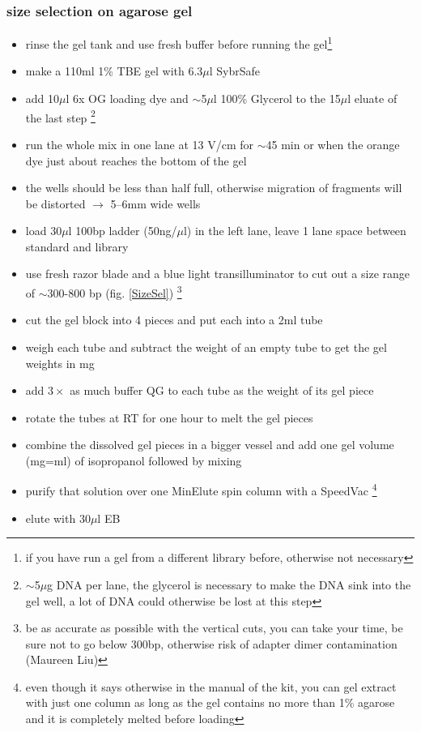 \subsubsection
{size selection on agarose gel}\label{sizeSelection}
\begin{itemize}
\item rinse the gel tank and use fresh buffer before running the gel\footnote{if you have run a gel from a different library before, otherwise not necessary} 
\item make a 110ml 1\% TBE gel with 6.3$\mu$l SybrSafe
\item add 10$\mu$l 6x OG loading dye and $\sim$5$\mu$l 100\% Glycerol to the 15$\mu$l eluate of the last step \footnote{$\sim$5$\mu$g DNA per lane, the glycerol is necessary to make the DNA sink into the gel well, a lot of DNA could otherwise be lost at this step}
\item run the whole mix in one lane at 13 V/cm for $\sim$45 min or when the orange dye just about reaches the bottom of the gel
\item the wells should be less than half full, otherwise migration of fragments will be distorted $\rightarrow$ 5--6mm wide wells
\item load 30$\mu$l 100bp ladder (50ng/$\mu$l) in the left lane, leave 1 lane space between standard and library
\item use fresh razor blade and a blue light transilluminator to cut out a size range of $\sim$300-800 bp (fig. \ref{SizeSel}) \footnote{be as accurate as possible with the vertical cuts, you can take your time, be sure not to go below 300bp, otherwise risk of adapter dimer contamination (Maureen Liu)}
\item cut the gel block into 4 pieces and put each into a 2ml tube
\item weigh each tube and subtract the weight of an empty tube to get the gel weights in mg
\item add $3 \times$ as much buffer QG to each tube as the weight of its gel piece
\item rotate the tubes at RT for one hour to melt the gel pieces 
\item combine the dissolved gel pieces in a bigger vessel and add one gel volume (mg=ml) of isopropanol followed by mixing
\item purify that solution over one MinElute spin column with a SpeedVac \footnote{even though it says otherwise in the manual of the kit, you can gel extract with just one column as long as the gel contains no more than 1\% agarose and it is completely melted before loading}
\item elute with 30$\mu$l EB
\end{itemize}

